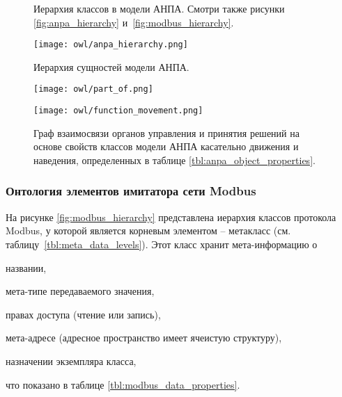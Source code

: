 \begin{figure}[hb!]
    \begin{center}
        \caption[Иерархия классов в модели АНПА.]
            {Иерархия классов в модели АНПА. Смотри также рисунки \ref{fig:anpa_hierarchy} и~\ref{fig:modbus_hierarchy}.}\label{fig:common_classs_hierarchy}
        \texttt{[image: owl/anpa\_hierarchy.png]}
        \caption{Иерархия сущностей модели АНПА.}\label{fig:anpa_hierarchy}
        \texttt{[image: owl/part\_of.png]}
        \caption[Граф свойств объектов]
            {Граф свойств объектов модели АНПА <<являться частью>> и  <<питание>>,
                определенных в таблице \ref{tbl:anpa_object_properties}.}\label{fig:part_of}
        \texttt{[image: owl/function\_movement.png]}
        \caption[Граф взаимосвязи органов управления]%
            {Граф взаимосвязи органов управления и принятия решений на основе свойств классов модели АНПА касательно движения и наведения,
                определенных в таблице \ref{tbl:anpa_object_properties}.}\label{fig:function_movement}
    \end{center}
\end{figure}



\subsubsection{Онтология элементов имитатора сети Modbus}\label{sec:ontology_modbus}

На рисунке \ref{fig:modbus_hierarchy} представлена иерархия классов протокола Modbus,
у которой \mbelement является корневым элементом -- метакласс (см. таблицу~\ref{tbl:meta_data_levels}).
Этот класс хранит мета-информацию о
\begin{enumerate*}[label=\arabic*\upshape)]
    \item названии, 
    \item мета-типе передаваемого значения,
    \item правах доступа (чтение или запись),
    \item мета-адресе (адресное пространство имеет ячеистую структуру),
    \item назначении экземпляра класса,
\end{enumerate*}
что показано в таблице \ref{tbl:modbus_data_properties}.
%



